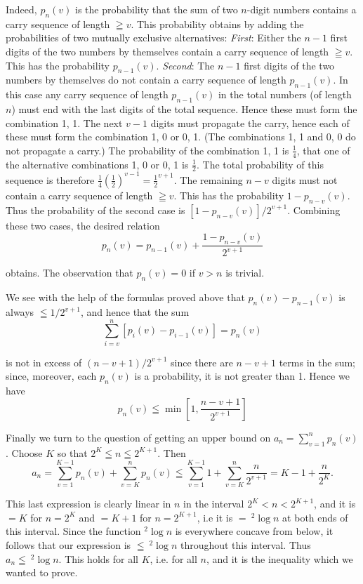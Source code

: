 \documentclass[12pt]{amsart}
\begin{document}
Indeed, $p_n(v)$ is the probability that the sum of two $n$-digit numbers contains a carry sequence of length $\geqq v$. This probability obtains by adding the probabilities of two mutually exclusive alternatives: \emph{First}: Either the $n - 1$ first digits of the two numbers by themselves contain a carry sequence of length $\geqq v$. This has the probability $p_{n-1}(v)$. \emph{Second}: The $n - 1$ first digits of the two numbers by themselves do not contain a carry sequence of length $p_{n-1}(v)$. In this case any carry sequence of length $p_{n-1}(v)$ in the total numbers (of length $n$) must end with the last digits of the total sequence. Hence these must form the combination 1, 1. The next $v - 1$ digits must propagate the carry, hence each of these must form the combination 1, 0 or 0, 1. (The combinations 1, 1 and 0, 0 do not propagate a carry.) The probability of the combination 1, 1 is $\frac{1}{4}$, that one of the alternative combinations 1, 0 or 0, 1 is $\frac{1}{2}$. The total probability of this sequence is therefore $\frac{1}{4}(\frac{1}{2})^{v-1} = \frac{1}{2}^{v+1}$. The remaining $n - v$ digits must not contain a carry sequence of length $\geqq v$. This has the probability $1 - p_{n-v}(v)$. Thus the probability of the second case is $[1 - p_{n-v}(v)]/2^{v + 1}$. Combining these two cases, the desired relation
\[
p_n(v) = p_{n - 1}(v) + \dfrac{1 - p_{n - v}(v)}{2^{v + 1}}
\]

obtains. The observation that $p_n(v) = 0$ if $v > n$ is trivial.

We see with the help of the formulas proved above that $p_n(v) - p_{n-1}(v)$ is always $\leqq 1/2^{v+1}$, and hence that the sum
\[
\sum_{i=v}^{n}[p_i(v) - p_{i - 1}(v)] = p_n(v)
\]

is not in excess of $(n - v + 1)/2^{v+1}$ since there are $n - v + 1$ terms in the sum; since, moreover, each $p_n(v)$ is a probability, it is not greater than 1. Hence we have
\[
p_n(v) \leqq \min \left[1, \dfrac{n - v + 1}{2^{v + 1}}\right]
\]

Finally we turn to the question of getting an upper bound on $a_n = \sum_{v=1}^n p_n(v)$. Choose $K$ so that $2^K \leqq n \leqq 2^{K + 1}$. Then
\[
a_n = \sum_{v = 1}^{K-1} p_n(v) + \sum_{v = K}^{n} p_n(v) \leqq \sum_{v = 1}^{K-1} 1 + \sum_{v = K}^{n} \dfrac{n}{2^{v + 1}} = K - 1 + \dfrac{n}{2^K}.
\]

This last expression is clearly linear in $n$ in the interval $2^K < n < 2^{K+1}$, and it is $=K$ for $n = 2^K$ and $=K + 1$ for $n = 2^{K + 1}$, i.e it is $=\ ^2\log n$ at both ends of this interval. Since the function $^2\log n$ is everywhere concave from below, it follows that our expression is $\leqq\ ^2\log n$ throughout this interval. Thus $a_n \leqq\ ^2\log n$. This holds for all $K$, i.e. for all $n$, and it is the inequality which we wanted to prove.
\end{document}
